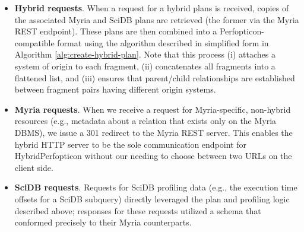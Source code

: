 \documentclass{chi2009}
\begin{document}
\begin{itemize}
\item \textbf{Hybrid requests}.  When a request for a hybrid plans is received, copies of the associated Myria and SciDB plans are retrieved (the former via the Myria REST endpoint).  These plans are then combined into a Perfopticon-compatible format using the algorithm described in simplified form in Algorithm \ref{alg:create-hybrid-plan}.  Note that this process (i) attaches a system of origin to each fragment, (ii) concatenates all fragments into a flattened list, and (iii) ensures that parent/child relationships are established between fragment pairs having different origin systems.
\item \textbf{Myria requests}.  When we receive a request for Myria-specific, non-hybrid resources (e.g., metadata about a relation that exists only on the Myria DBMS), we issue a 301 redirect to the Myria REST server.  This enables the hybrid HTTP server to be the sole communication endpoint for HybridPerfopticon without our needing to choose between two URLs on the client side.
\item \textbf{SciDB requests}.  Requests for SciDB profiling data (e.g., the execution time offsets for a SciDB subquery) directly leveraged the plan and profiling logic described above; responses for these requests utilized a schema that conformed precisely to their Myria counterparts.
\end{itemize}
\end{document}
